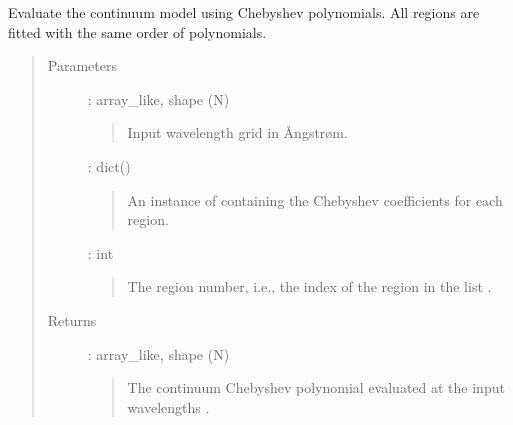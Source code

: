 \documentclass[letterpaper,10pt,english]{sphinxmanual}
\begin{document}

\begin{fulllineitems}
\label{\detokenize{api:voigt.evaluate_continuum}}
Evaluate the continuum model using Chebyshev polynomials.
All regions are fitted with the same order of polynomials.
\begin{quote}\begin{description}
\item[{Parameters}] \leavevmode
{} : array\_like, shape (N)
\begin{quote}

Input wavelength grid in Ångstrøm.
\end{quote}

 : dict()
\begin{quote}

An instance of  containing the Chebyshev
coefficients for each region.
\end{quote}

 : int
\begin{quote}

The region number, i.e., the index of the region in the list
.
\end{quote}

\item[{Returns}] \leavevmode
{} : array\_like, shape (N)
\begin{quote}

The continuum Chebyshev polynomial evaluated at the input wavelengths .
\end{quote}

\end{description}\end{quote}

\end{fulllineitems}

\end{document}
